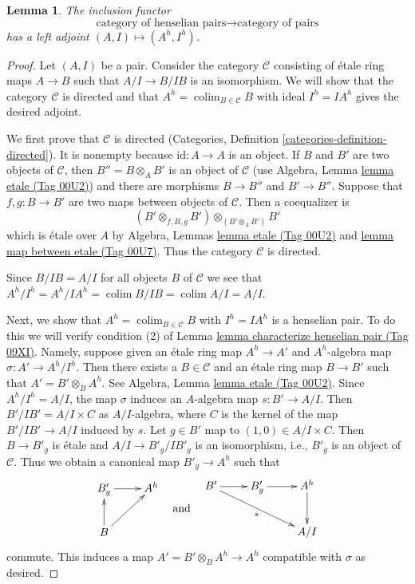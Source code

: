 \documentclass{amsart}
\theoremstyle{plain}
\newtheorem{lemma}[subsection]{Lemma}
\theoremstyle{definition}
\theoremstyle{remark}
\numberwithin{equation}{subsection}
\def\colim{\mathop{\mathrm{colim}}\nolimits}
\begin{document}
\begin{lemma}
\label{lemma-henselization}
The inclusion functor
$$
\text{category of henselian pairs}
\longrightarrow
\text{category of pairs}
$$
has a left adjoint $(A, I) \mapsto (A^h, I^h)$.
\end{lemma}

\begin{proof}
Let $(A, I)$ be a pair. Consider the category $\mathcal{C}$ consisting
of \'etale ring maps $A \to B$ such that $A/I \to B/IB$ is an isomorphism.
We will show that the category $\mathcal{C}$ is directed and that
$A^h = \colim_{B \in \mathcal{C}} B$ with ideal $I^h = IA^h$ gives
the desired adjoint.

\medskip\noindent
We first prove that $\mathcal{C}$ is directed
(Categories, Definition \ref{categories-definition-directed}).
It is nonempty because $\text{id} : A \to A$ is an object.
If $B$ and $B'$ are two objects of $\mathcal{C}$, then
$B'' = B \otimes_A B'$ is an object of $\mathcal{C}$
(use Algebra, Lemma \href{https://stacks.math.columbia.edu/tag/00U2}{lemma etale (Tag 00U2)})
and there are morphisms $B \to B''$ and $B' \to B''$.
Suppose that $f, g : B \to B'$ are two maps between
objects of $\mathcal{C}$. Then a coequalizer is
$$
(B' \otimes_{f, B, g} B') \otimes_{(B' \otimes_A B')} B'
$$
which is \'etale over $A$ by
Algebra, Lemmas \href{https://stacks.math.columbia.edu/tag/00U2}{lemma etale (Tag 00U2)} and
\href{https://stacks.math.columbia.edu/tag/00U7}{lemma map between etale (Tag 00U7)}.
Thus the category $\mathcal{C}$ is directed.

\medskip\noindent
Since $B/IB = A/I$ for all objects $B$ of $\mathcal{C}$ we
see that $A^h/I^h = A^h/IA^h = \colim B/IB = \colim A/I = A/I$.

\medskip\noindent
Next, we show that $A^h = \colim_{B \in \mathcal{C}} B$ with
$I^h = IA^h$ is a henselian pair. To do this we will verify
condition (2) of Lemma \href{https://stacks.math.columbia.edu/tag/09XI}{lemma characterize henselian pair (Tag 09XI)}.
Namely, suppose given an \'etale ring map $A^h \to A'$
and $A^h$-algebra map $\sigma : A' \to A^h/I^h$. Then there exists a
$B \in \mathcal{C}$ and an \'etale ring map $B \to B'$ such that
$A' = B' \otimes_B A^h$. See Algebra, Lemma \href{https://stacks.math.columbia.edu/tag/00U2}{lemma etale (Tag 00U2)}.
Since $A^h/I^h = A/I$, the map $\sigma$ induces an $A$-algebra
map $s : B' \to A/I$. Then $B'/IB' = A/I \times C$ as $A/I$-algebra,
where $C$ is the kernel of the map $B'/IB' \to A/I$ induced by $s$.
Let $g \in B'$ map to $(1, 0) \in A/I \times C$. Then $B \to B'_g$
is \'etale and $A/I \to B'_g/IB'_g$ is an isomorphism, i.e.,
$B'_g$ is an object of $\mathcal{C}$. Thus we obtain a canonical
map $B'_g \to A^h$ such that
$$
\vcenter{
\xymatrix{
B'_g \ar[r] & A^h \\
B \ar[u] \ar[ur]
}
}
\quad\text{and}\quad
\vcenter{
\xymatrix{
B' \ar[r] \ar[rrd]_s & B'_g \ar[r] & A^h \ar[d] \\
& & A/I
}
}
$$
commute. This induces a map $A' = B' \otimes_B A^h \to A^h$
compatible with $\sigma$ as desired.


\end{proof}
\end{document}
